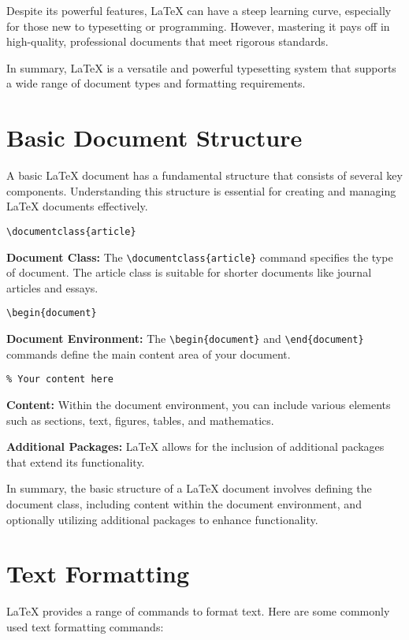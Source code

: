 \documentclass{article}
\begin{document}
Despite its powerful features, LaTeX{} can have a steep learning curve, especially for those new to typesetting or programming. However, mastering it pays off in high-quality, professional documents that meet rigorous standards.

In summary, LaTeX{} is a versatile and powerful typesetting system that supports a wide range of document types and formatting requirements.

\section{Basic Document Structure}
A basic LaTeX{} document has a fundamental structure that consists of several key components. Understanding this structure is essential for creating and managing LaTeX{} documents effectively.

\begin{verbatim}
\documentclass{article}
\end{verbatim}
\textbf{Document Class:} The \texttt{\textbackslash documentclass\{article\}} command specifies the type of document. The article class is suitable for shorter documents like journal articles and essays.

\begin{verbatim}
\begin{document}
\end{verbatim}
\textbf{Document Environment:} The \texttt{\textbackslash begin\{document\}} and \texttt{\textbackslash end\{document\}} commands define the main content area of your document.

\begin{verbatim}
% Your content here
\end{verbatim}
\textbf{Content:} Within the document environment, you can include various elements such as sections, text, figures, tables, and mathematics.

\textbf{Additional Packages:} LaTeX{} allows for the inclusion of additional packages that extend its functionality.

In summary, the basic structure of a LaTeX{} document involves defining the document class, including content within the document environment, and optionally utilizing additional packages to enhance functionality.

\section{Text Formatting}
LaTeX{} provides a range of commands to format text. Here are some commonly used text formatting commands:
\end{document}
